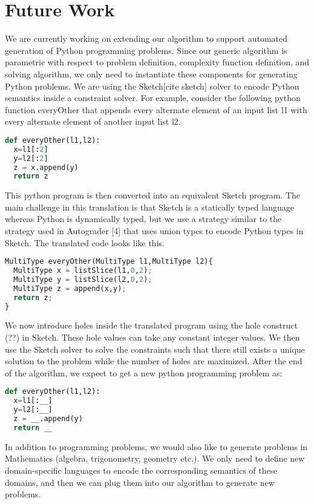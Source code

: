 \section{Future Work}

We are currently working on extending our algorithm to support automated generation of Python programming problems. Since our generic algorithm is parametric with respect to problem definition, complexity function definition, and solving algorithm, we only need to instantiate these components for generating Python problems. We are using the Sketch[cite sketch] solver to encode Python semantics inside a constraint solver. For example, consider the following python function everyOther that appends every alternate element of an input list l1 with every alternate element of another input list l2.

\singlespace
\begin{lstlisting}[language=Python, frame=single]
def everyOther(l1,l2):
  x=l1[:2]
  y=l2[:2]
  z = x.append(y)
  return z

\end{lstlisting}
\doublespace

This python program is then converted into an equivalent Sketch program. The main challenge in this translation is that Sketch is a statically typed language whereas Python is dynamically typed, but we use a strategy similar to the strategy used in Autograder [4] that uses union types to encode Python types in Sketch. The translated code looks like this.

\singlespace
\begin{lstlisting}[language=Python, frame=single]
MultiType everyOther(MultiType l1,MultiType l2){
  MultiType x = listSlice(l1,0,2);
  MultiType y = listSlice(l2,0,2);
  MultiType z = append(x,y);
  return z;
}
\end{lstlisting}
\doublespace

We now introduce holes inside the translated program using the hole construct (??) in Sketch. These hole values can take any constant integer values. We then use the Sketch solver to solve the constraints such that there still exists a unique solution to the problem while the number of holes are maximized. After the end of the algorithm, we expect to get a new python programming problem as:

\singlespace
\begin{lstlisting}[language=Python, frame=single]
def everyOther(l1,l2):
  x=l1[:__]
  y=l2[:__]
  z = __.append(y)
  return __
\end{lstlisting}
\doublespace

In addition to programming problems, we would also like to generate problems in Mathematics (algebra, trigonometry, geometry etc.). We only need to define new domain-specific languages to encode the corresponding semantics of these domains, and then we can plug them into our algorithm to generate new problems.
